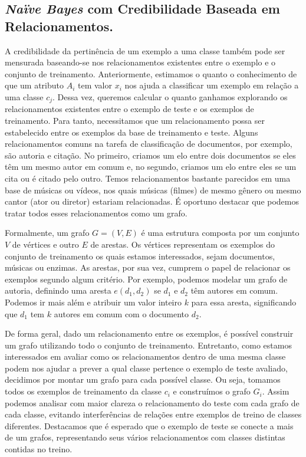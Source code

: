 
\subsection{\textit{Naïve Bayes} com Credibilidade Baseada em Relacionamentos.}
\label{subsubsec::nbcredgrafos}

A credibilidade da pertinência de um exemplo a uma classe também pode ser mensurada baseando-se nos relacionamentos existentes entre o exemplo e o conjunto de treinamento. Anteriormente, estimamos o quanto o conhecimento de que um atributo $A_i$ tem valor $x_i$ nos ajuda a classificar um exemplo em relação a uma classe $c_j$. Dessa vez, queremos calcular o quanto ganhamos explorando os relacionamentos existentes entre o exemplo de teste e os exemplos de treinamento. Para tanto, necessitamos que um relacionamento possa ser estabelecido entre os exemplos da base de treinamento e teste. Alguns relacionamentos comuns na tarefa de classificação de documentos, por exemplo, são autoria e citação. No primeiro, criamos um elo entre dois documentos se eles têm um mesmo autor em comum e, no segundo, criamos um elo entre eles se um cita ou é citado pelo outro. Temos relacionamentos bastante parecidos em uma base de músicas ou vídeos, nos quais músicas (filmes) de mesmo gênero ou mesmo cantor (ator ou diretor) estariam relacionadas. É oportuno destacar que podemos tratar todos esses relacionamentos como um grafo.

Formalmente, um grafo $G = (V,E)$ é uma estrutura composta por um conjunto $V$ de vértices e outro $E$ de arestas. Os vértices representam os exemplos do conjunto de treinamento os quais estamos interessados, sejam documentos, músicas ou enzimas. As arestas, por sua vez, cumprem o papel de relacionar os exemplos segundo algum critério. Por exemplo, podemos modelar um grafo de autoria, definindo uma aresta $e(d_1,d_2)$ se $d_1$ e $d_2$ têm autores em comum. Podemos ir mais além e atribuir um valor inteiro $k$ para essa aresta, significando que $d_1$ tem $k$ autores em comum com o documento $d_2$.

De forma geral, dado um relacionamento entre os exemplos, é possível construir um grafo utilizando todo o conjunto de treinamento. Entretanto, como estamos interessados em avaliar como os relacionamentos dentro de uma mesma classe podem nos ajudar a prever a qual classe pertence o exemplo de teste avaliado, decidimos por montar um grafo para cada possível classe. Ou seja, tomamos todos os exemplos de treinamento da classe $c_i$ e construímos o grafo $G_i$. Assim podemos analisar com maior clareza o relacionamento do teste com cada grafo de cada classe, evitando interferências de relações entre exemplos de treino de classes diferentes. Destacamos que é esperado que o exemplo de teste se conecte a mais de um grafos, representando seus vários relacionamentos com classes distintas contidas no treino.

